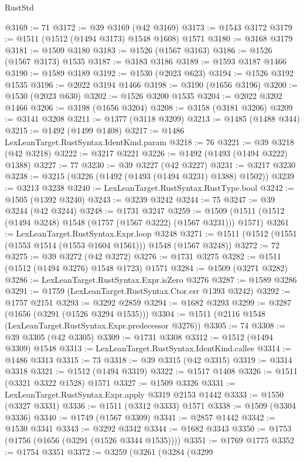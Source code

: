 \begin{lexlean}{RustStd}
\begin{coremodule}
{\begin{coremodule}
{{{{{{{{{{{{{{{{{{{{{{{{{{{{{{{{{{{@3169 := 71
@3172 := @39 @3169 (@42 @3169)
@3173 := @1543 @3172
@3179 := @1511 (@1512 (@1494 @3173) @1548 @1608) @1571
@3180 := @3168 @3179
@3181 := @1509 @3180
@3183 := @1526 (@1567 @3163)
@3186 := @1526 (@1567 @3173) @1535
@3187 := @3183 @3186
@3189 := @1593 @3187 @1466
@3190 := @1589 @3189
@3192 := @1530 (@2023 @623)
@3194 := @1526 @3192 @1535
@3196 := @2022 @3194 @1466
@3198 := @3190 (@1656 @3196)
@3200 := @1530 (@2023 @630)
@3202 := @1526 @3200 @1535
@3204 := @2022 @3202 @1466
@3206 := @3198 (@1656 @3204)
@3208 := @3158 (@3181 @3206)
@3209 := @3141 @3208
@3211 := @1377 (@3118 @3209)
@3213 := @1485 (@1488 @344)
@3215 := @1492 (@1499 @1408)
@3217 := @1486 LexLeanTarget.RustSyntax.IdentKind.param
@3218 := 76
@3221 := @39 @3218 (@42 @3218)
@3222 := @3217 @3221
@3226 := @1492 (@1493 (@1494 @3222) @1388)
@3227 := 77
@3230 := @39 @3227 (@42 @3227)
@3231 := @3217 @3230
@3238 := @3215 (@3226 (@1492 (@1493 (@1494 @3231) @1388) @1502))
@3239 := @3213 @3238
@3240 := LexLeanTarget.RustSyntax.RustType.bool
@3242 := @1505 (@1392 @3240)
@3243 := @3239 @3242
@3244 := 75
@3247 := @39 @3244 (@42 @3244)
@3248 := @1731 @3247
@3259 := @1509 (@1511 (@1512 (@1494 @3248) @1548 (@1757 (@1567 @3222) (@1567 @3231))) @1571)
@3261 := LexLeanTarget.RustSyntax.Expr.loop @3248
@3271 := @1511 (@1512 (@1551 (@1553 @1514 (@1553 @1604 @1561))) @1548 (@1567 @3248))
@3272 := 72
@3275 := @39 @3272 (@42 @3272)
@3276 := @1731 @3275
@3282 := @1511 (@1512 (@1494 @3276) @1548 @1723) @1571
@3284 := @1509 (@3271 @3282)
@3286 := LexLeanTarget.RustSyntax.Expr.isZero @3276
@3287 := @1589 @3286
@3291 := @1759 (LexLeanTarget.RustSyntax.Ctor.err @1393 @3242)
@3292 := @1757 @2151
@3293 := @3292 @2859
@3294 := @1682 @3293
@3299 := @3287 (@1656 (@3291 (@1526 @3294 @1535)))
@3304 := @1511 (@2116 @1548 (LexLeanTarget.RustSyntax.Expr.predecessor @3276))
@3305 := 74
@3308 := @39 @3305 (@42 @3305)
@3309 := @1731 @3308
@3312 := @1512 (@1494 @3309) @1548
@3313 := LexLeanTarget.RustSyntax.IdentKind.callee
@3314 := @1486 @3313
@3315 := 73
@3318 := @39 @3315 (@42 @3315)
@3319 := @3314 @3318
@3321 := @1512 (@1494 @3319)
@3322 := @1517 @1408
@3326 := @1511 (@3321 @3322 @1528) @1571
@3327 := @1509 @3326
@3331 := LexLeanTarget.RustSyntax.Expr.apply @3319 @2153 @1442
@3333 := @1550 (@3327 @3331)
@3336 := @1511 (@3312 @3333) @1571
@3338 := @1509 (@3304 @3336)
@3340 := @1749 (@1567 @3309)
@3341 := @2857 @1442
@3342 := @1530 @3341
@3343 := @3292 @3342
@3344 := @1682 @3343
@3350 := @1753 (@1756 (@1656 (@3291 (@1526 @3344 @1535))))
@3351 := @1769 @1775
@3352 := @1754 @3351
@3372 := @3259
    (@3261
      (@3284
        (@3299
}}}}}}}}}}}}}}}}}}}}}}}}}}}}}}}}}}}
\end{coremodule}}
\end{coremodule}
\end{lexlean}
